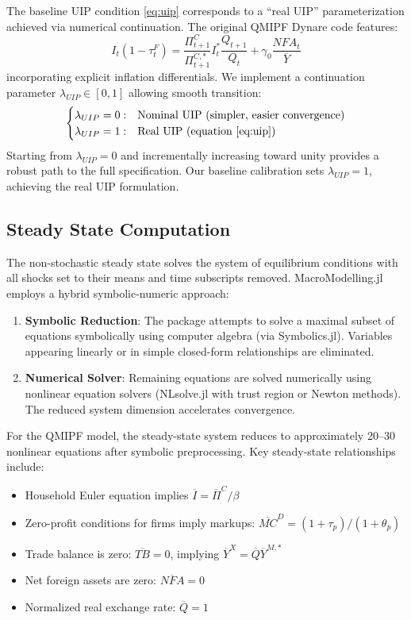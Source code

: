 \documentclass[12pt]{article}
\begin{document}
The baseline UIP condition \eqref{eq:uip} corresponds to a ``real UIP'' parameterization achieved via numerical continuation. The original QMIPF Dynare code features:
\begin{equation}
I_t (1 - \tau_t^F) = \frac{\Pi_{t+1}^C}{\Pi_{t+1}^{C,*}} I_t^* \frac{Q_{t+1}}{Q_t} + \gamma_0 \frac{NFA_t}{\overline{Y}}
\end{equation}
incorporating explicit inflation differentials. We implement a continuation parameter $\lambda_{UIP} \in [0,1]$ allowing smooth transition:
\begin{equation*}
\begin{cases}
\lambda_{UIP} = 0: & \text{Nominal UIP (simpler, easier convergence)} \\
\lambda_{UIP} = 1: & \text{Real UIP (equation \eqref{eq:uip})}
\end{cases}
\end{equation*}
Starting from $\lambda_{UIP}=0$ and incrementally increasing toward unity provides a robust path to the full specification. Our baseline calibration sets $\lambda_{UIP}=1$, achieving the real UIP formulation.

\subsection{Steady State Computation}

The non-stochastic steady state solves the system of equilibrium conditions with all shocks set to their means and time subscripts removed. MacroModelling.jl employs a hybrid symbolic-numeric approach:
\begin{enumerate}
\item \textbf{Symbolic Reduction}: The package attempts to solve a maximal subset of equations symbolically using computer algebra (via Symbolics.jl). Variables appearing linearly or in simple closed-form relationships are eliminated.
\item \textbf{Numerical Solver}: Remaining equations are solved numerically using nonlinear equation solvers (NLsolve.jl with trust region or Newton methods). The reduced system dimension accelerates convergence.
\end{enumerate}

For the QMIPF model, the steady-state system reduces to approximately 20--30 nonlinear equations after symbolic preprocessing. Key steady-state relationships include:
\begin{itemize}
\item Household Euler equation implies $\overline{I} = \overline{\Pi}^C / \beta$
\item Zero-profit conditions for firms imply markups: $\overline{MC}^D = (1+\tau_p)/(1+\theta_p)$
\item Trade balance is zero: $\overline{TB} = 0$, implying $\overline{Y}^X = \overline{Q} \overline{Y}^{M,*}$
\item Net foreign assets are zero: $\overline{NFA} = 0$
\item Normalized real exchange rate: $\overline{Q} = 1$
\end{itemize}
\end{document}
